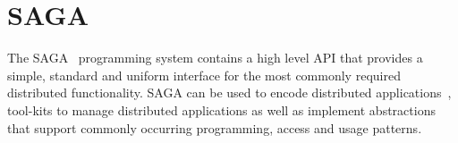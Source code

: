 \documentclass[conference,final]{IEEEtran}
\begin{document}

\section{SAGA}


The SAGA~\cite{saga-core} programming system contains a high level API
that provides a simple, standard and uniform interface for the most
commonly required distributed functionality.  SAGA can be used to
encode distributed applications~\cite{saga_escience07_short,
  saga_tg08}, tool-kits to manage distributed applications as well as
implement abstractions that support commonly occurring programming,
access and usage patterns.
\end{document}
